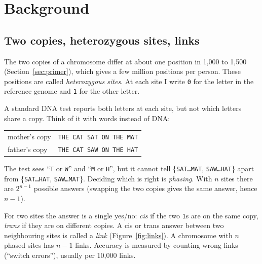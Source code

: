 \documentclass[11pt]{article}
\newcommand{\dna}[1]{\texttt{#1}}
\begin{document}
\section{Background}\label{sec:bio}

\subsection{Two copies, heterozygous sites, links}

The two copies of a chromosome differ at about one position in 1{,}000 to
1{,}500 (Section~\ref{sec:primer}), which gives a few million positions per
person. These positions are called \emph{heterozygous sites}. At each site I
write \dna{0} for the letter in the reference genome and \dna{1} for the
other letter.

A standard DNA test reports both letters at each site, but not which letters
share a copy. Think of it with words instead of DNA:

\begin{center}
\small
\begin{tabular}{@{}ll@{}}
mother's copy & \dna{THE CAT SAT ON THE MAT}\\
father's copy & \dna{THE CAT SA\textcolor{hapB}{W} ON THE \textcolor{hapB}{H}AT}\\
\end{tabular}
\end{center}

The test sees \enquote{\dna{T} or \dna{W}} and \enquote{\dna{M} or \dna{H}}, but it
cannot tell \{\dna{SAT\dots MAT}, \dna{SAW\dots HAT}\} apart from
\{\dna{SAT\dots HAT}, \dna{SAW\dots MAT}\}. Deciding which is right is
\emph{phasing}. With $n$ sites there are $2^{n-1}$ possible answers
(swapping the two copies gives the same answer, hence $n-1$).

For two sites the answer is a single yes/no: \emph{cis} if the two \dna{1}s
are on the same copy, \emph{trans} if they are on different copies. A cis or
trans answer between two neighbouring sites is called a \emph{link}
(Figure~\ref{fig:links}). A chromosome with $n$ phased sites has $n-1$
links. Accuracy is measured by counting wrong links (\enquote{switch errors}),
usually per 10{,}000 links.
\end{document}
